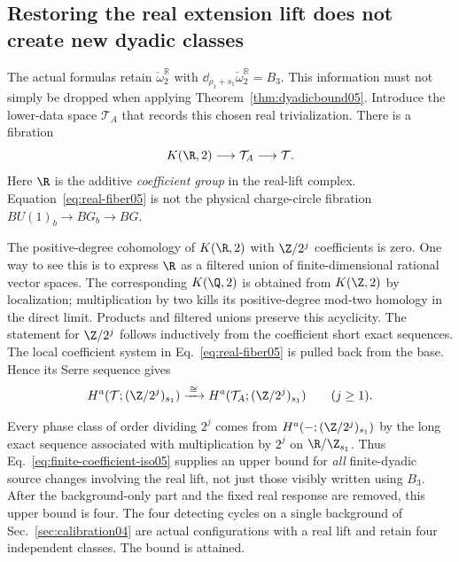 \subsection{Restoring the real extension lift does not create new dyadic classes}\label{subsec:real-lift05}
The actual formulas retain $\check\omega_2^{\mathbb R}$ with $\dd_{\rho_1+s_1} \check\omega_2^{\mathbb R}=B_3$. This information must not simply be dropped when applying Theorem~\ref{thm:dyadicbound05}. Introduce the lower-data space $\mathcal T_A$ that records this chosen real trivialization. There is a fibration
\begin{equation}\label{eq:real-fiber05}
 K(\R,2)\longrightarrow\mathcal T_A\longrightarrow\mathcal T.
\end{equation}
Here $\R$ is the additive \emph{coefficient group} in the real-lift complex. Equation~\eqref{eq:real-fiber05} is not the physical charge-circle fibration $BU(1)_b\to BG_b\to BG$.

The positive-degree cohomology of $K(\R,2)$ with $\Z/2^j$ coefficients is zero. One way to see this is to express $\R$ as a filtered union of finite-dimensional rational vector spaces. The corresponding $K(\Q,2)$ is obtained from $K(\Z,2)$ by localization; multiplication by two kills its positive-degree mod-two homology in the direct limit. Products and filtered unions preserve this acyclicity. The statement for $\Z/2^j$ follows inductively from the coefficient short exact sequences. The local coefficient system in Eq.~\eqref{eq:real-fiber05} is pulled back from the base. Hence its Serre sequence gives
\begin{equation}\label{eq:finite-coefficient-iso05}
 H^a(\mathcal T;(\Z/2^j)_{s_1})\xrightarrow{\;\cong\;}
 H^a(\mathcal T_A;(\Z/2^j)_{s_1})
 \qquad(j\geq1).
\end{equation}

Every phase class of order dividing $2^j$ comes from $H^a(-;(\Z/2^j)_{s_1})$ by the long exact sequence associated with multiplication by $2^j$ on $\R/\Z_{s_1}$. Thus Eq.~\eqref{eq:finite-coefficient-iso05} supplies an upper bound for \emph{all} finite-dyadic source changes involving the real lift, not just those visibly written using $B_3$. After the background-only part and the fixed real response are removed, this upper bound is four. The four detecting cycles on a single background of Sec.~\ref{sec:calibration04} are actual configurations with a real lift and retain four independent classes. The bound is attained.

